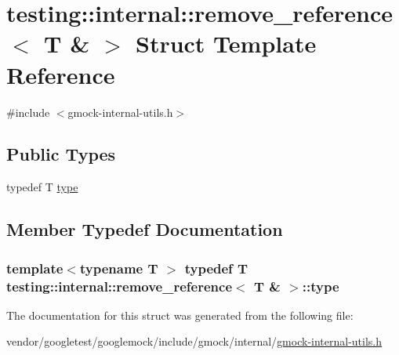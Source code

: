 \hypertarget{structtesting_1_1internal_1_1remove__reference_3_01T_01_6_01_4}{}\section{testing\+:\+:internal\+:\+:remove\+\_\+reference$<$ T \& $>$ Struct Template Reference}
\label{structtesting_1_1internal_1_1remove__reference_3_01T_01_6_01_4}


{\ttfamily \#include $<$gmock-\/internal-\/utils.\+h$>$}

\subsection*{Public Types}
\begin{DoxyCompactItemize}
\item 
typedef T \hyperlink{structtesting_1_1internal_1_1remove__reference_3_01T_01_6_01_4_a0d72f004f54016a47c752a82be352a19}{type}
\end{DoxyCompactItemize}


\subsection{Member Typedef Documentation}
\subsubsection[{\texorpdfstring{type}{type}}]{\setlength{\rightskip}{0pt plus 5cm}template$<$typename T $>$ typedef T {\bf testing\+::internal\+::remove\+\_\+reference}$<$ T \& $>$\+::{\bf type}}\hypertarget{structtesting_1_1internal_1_1remove__reference_3_01T_01_6_01_4_a0d72f004f54016a47c752a82be352a19}{}\label{structtesting_1_1internal_1_1remove__reference_3_01T_01_6_01_4_a0d72f004f54016a47c752a82be352a19}


The documentation for this struct was generated from the following file\+:\begin{DoxyCompactItemize}
\item 
vendor/googletest/googlemock/include/gmock/internal/\hyperlink{gmock-internal-utils_8h}{gmock-\/internal-\/utils.\+h}\end{DoxyCompactItemize}

